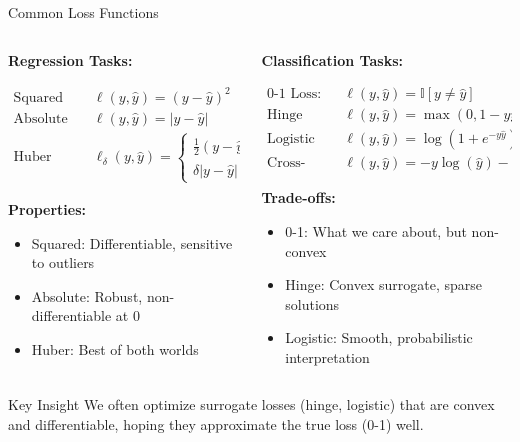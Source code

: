 \documentclass[aspectratio=169,11pt]{beamer}
\begin{document}
\begin{frame}{Common Loss Functions}
\begin{columns}
\begin{column}[t]{0.5\textwidth}
\textbf{Regression Tasks:}

\begin{align}
\text{Squared Loss:} \quad &\ell(y, \hat{y}) = (y - \hat{y})^2\\
\text{Absolute Loss:} \quad &\ell(y, \hat{y}) = |y - \hat{y}|\\
\text{Huber Loss:} \quad &\ell_\delta(y, \hat{y}) = \begin{cases}
\frac{1}{2}(y - \hat{y})^2 & \text{if } |y - \hat{y}| \leq \delta \\
\delta|y - \hat{y}| - \frac{1}{2}\delta^2 & \text{otherwise}
\end{cases}
\end{align}

\textbf{Properties:}
\begin{itemize}
\item Squared: Differentiable, sensitive to outliers
\item Absolute: Robust, non-differentiable at 0
\item Huber: Best of both worlds
\end{itemize}
\end{column}
\begin{column}[t]{0.5\textwidth}
\textbf{Classification Tasks:}

\begin{align}
\text{0-1 Loss:} \quad &\ell(y, \hat{y}) = \mathbb{I}[y \neq \hat{y}]\\
\text{Hinge Loss:} \quad &\ell(y, \hat{y}) = \max(0, 1 - y\hat{y})\\
\text{Logistic Loss:} \quad &\ell(y, \hat{y}) = \log(1 + e^{-y\hat{y}})\\
\text{Cross-entropy:} \quad &\ell(y, \hat{y}) = -y\log(\hat{y}) - (1-y)\log(1-\hat{y})
\end{align}

\textbf{Trade-offs:}
\begin{itemize}
\item 0-1: What we care about, but non-convex
\item Hinge: Convex surrogate, sparse solutions
\item Logistic: Smooth, probabilistic interpretation
\end{itemize}
\end{column}
\end{columns}

\vspace{0.3cm}
\begin{alertblock}{Key Insight}
We often optimize surrogate losses (hinge, logistic) that are convex and differentiable, hoping they approximate the true loss (0-1) well.
\end{alertblock}
\end{frame}
\end{document}
